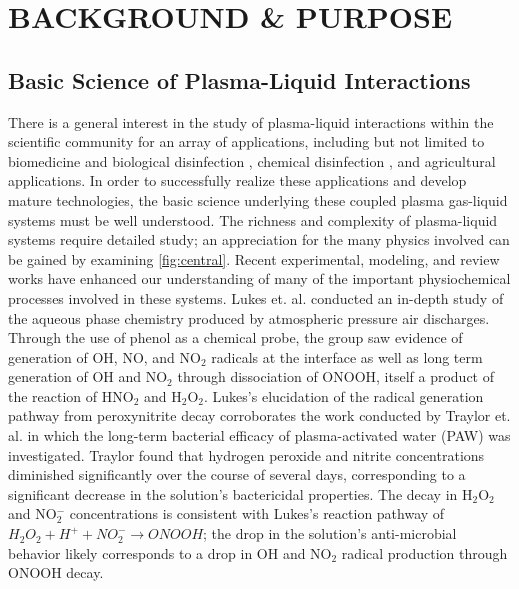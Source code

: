 \chapter{BACKGROUND \& PURPOSE}
\label{chap-one}

\section{Basic Science of Plasma-Liquid Interactions}
\label{sec:intro_plasliq}

There is a general interest in the study of plasma-liquid interactions within the scientific community for an array of applications, including but not limited to biomedicine and biological disinfection \cite{Kong2009b,Laroussi2009,Shimizu2014c,VonWoedtke2014a,VonWoedtke2013a,Joubert2013a}, chemical disinfection \cite{Johnson2006,Locke2006,Theron2008}, and agricultural applications. \cite{Park2013b,Lindsay2014} In order to successfully realize these applications and develop mature technologies, the basic science underlying these coupled plasma gas-liquid systems must be well understood. The richness and complexity of plasma-liquid systems require detailed study; an appreciation for the many physics involved can be gained by examining \cref{fig:central}. Recent experimental, modeling, and review works have enhanced our understanding of many of the important physiochemical processes involved in these systems. Lukes et. al. \cite{Lukes2014b} conducted an in-depth study of the aqueous phase chemistry produced by atmospheric pressure air discharges. Through the use of phenol as a chemical probe, the group saw evidence of generation of OH, NO, and NO$_2$ radicals at the interface as well as long term generation of OH and NO$_2$ through dissociation of ONOOH, itself a product of the reaction of HNO$_2$ and H$_2$O$_2$. Lukes's elucidation of the radical generation pathway from peroxynitrite decay corroborates the work conducted by Traylor et. al. \cite{Traylor2011h} in which the long-term bacterial efficacy of plasma-activated water (PAW) was investigated. Traylor found that hydrogen peroxide and nitrite concentrations diminished significantly over the course of several days, corresponding to a significant decrease in the solution's bactericidal properties. The decay in H$_2$O$_2$ and NO$_2^-$ concentrations is consistent with Lukes's reaction pathway of $H_2O_2 + H^+ + NO_2^- \rightarrow ONOOH$; the drop in the solution's anti-microbial behavior likely corresponds to a drop in OH and NO$_2$ radical production through ONOOH decay.

